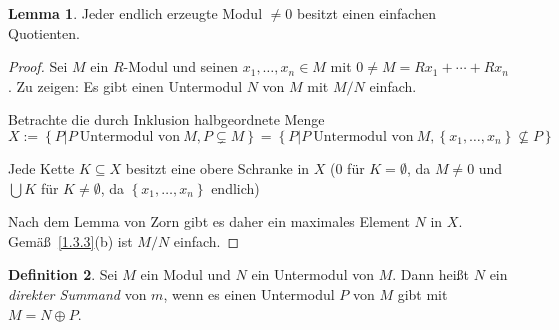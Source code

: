 \documentclass[
twoside=semi,
fontsize=12,
DIV=12, 
cleardoublepage=current,
leqno,
headings=optiontoheadandtoc, 
toc=idx
]{scrbook}
\newcommand{\set}[1]{\left\{ #1 \right\}}
\theoremstyle{definition}
\newtheorem{definition}{Definition}[section]
\newtheorem{lemma}[definition]{Lemma}
\begin{document}
	\begin{lemma}\label{1.3.8}
		Jeder endlich erzeugte Modul $\neq 0$ besitzt einen einfachen Quotienten.
		
		\begin{proof}
			Sei $M$ ein $R$-Modul und seinen $x_1, \dots, x_n \in M$ mit $0 \neq M = Rx_1 + \cdots + Rx_n$. Zu zeigen: Es gibt einen Untermodul $N$ von $M$ mit $M/N$ einfach.
			
			\noindent Betrachte die durch Inklusion halbgeordnete Menge 
				\[X:=\set{P|P\ \textrm{Untermodul von} \ M, P \subsetneq M} = \set{P|P\ \textrm{Untermodul von} \ M, \set{x_1, \dots, x_n} \nsubseteq P}\]
			
			\noindent Jede Kette $K \subseteq X$ besitzt eine obere Schranke in $X$ ($0$ f\"ur $K = \emptyset$, da $M \neq 0$ und $\bigcup K$ f\"ur $K \neq \emptyset$, da $\set{x_1, \dots, x_n}$ endlich)
			
			\noindent Nach dem Lemma von Zorn gibt es daher ein maximales Element $N$ in $X$. Gem\"a\ss \ \ref{1.3.3}(b) ist $M/N$ einfach. 
		\end{proof}
	\end{lemma}

	\begin{definition}\label{1.3.9}
		Sei $M$ ein Modul und $N$ ein Untermodul von $M$. Dann hei\ss t $N$ ein \emph{direkter Summand} von $m$, wenn es einen Untermodul $P$ von $M$ gibt mit $M = N \oplus P$.
	\end{definition}
\end{document}
